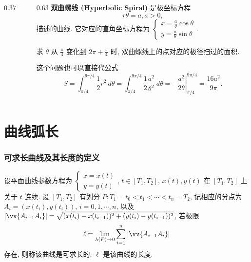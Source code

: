 \begin{frame}
\begin{columns}
\begin{column}{0.37\textwidth}
\begin{tikzpicture}[scale=2]
\end{tikzpicture}
\end{column}
\begin{column}{0.63\textwidth}
\textbf{双曲螺线 (Hyperbolic Spiral)} 是极坐标方程
\[
r\theta = a, a > 0,
\]
描述的曲线. 它对应的直角坐标方程为 $\begin{cases} x = \frac{a}{\theta}\cos\theta \\[3pt] y = \frac{a}{\theta}\sin\theta \end{cases}$.

\pause

\begin{question}
求 $\theta$ 从 $\frac{\pi}{4}$ 变化到 $2\pi + \frac{\pi}{4}$ 时, 双曲螺线上的点对应的极径扫过的面积.
\end{question}

\pause

这个问题也可以直接代公式
\[
S = \int_{\pi/4}^{9\pi/4} \frac{1}{2} r^2 ~ d\theta = \int_{\pi/4}^{9\pi/4} \frac{1}{2} \frac{a^2}{\theta^2} ~ d\theta = - \left. \frac{a^2}{2\theta} \right|_{\pi/4}^{9\pi/4} = \frac{16 a^2}{9 \pi}.
\]

\end{column}
\end{columns}

\end{frame}


\section{曲线弧长}


\begin{frame}
\frametitle{可求长曲线及其长度的定义}

\begin{Def}
设平面曲线参数方程为 $\begin{cases} x = x(t) \\[3pt] y = y(t) \end{cases}$, $t \in [T_1, T_2]$, $x(t), y(t)$ 在 $[T_1, T_2]$ 上关于 $t$ 连续. 设 $[T_1, T_2]$ 有划分 $P: T_1 = t_0 < t_1 < \cdots < t_n = T_2$, 记相应的分点为 $A_i = (x(t_i), y(t_i))$, $i = 0, 1, \cdots, n$, 以及 $\left\lvert \vv{A_{i-1}A_i} \right\rvert = \sqrt{(x(t_i) - x(t_{i-1}))^2 + (y(t_i) - y(t_{i-1}))^2}$, 若极限
\[
\ell = \lim_{\lambda(P) \to 0} \sum_{i=1}^n \left\lvert \vv{A_{i-1}A_i} \right\rvert
\]
存在, 则称该曲线是\alert{可求长的}, $\ell$ 是该曲线的\alert{长度}.
\end{Def}

\end{frame}


